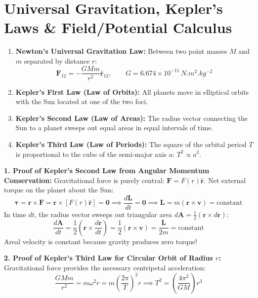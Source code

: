 \documentclass[10pt,a4paper]{article}
\begin{document}
\section{Universal Gravitation, Kepler's Laws \& Field/Potential Calculus}

\begin{conceptbox}
\begin{enumerate}[leftmargin=*]
  \item \textbf{Newton's Universal Gravitation Law:} Between two point masses $M$ and $m$ separated by distance $r$:
  \begin{equation}
    \mathbf{F}_{12} = -\frac{G M m}{r^2}\hat{\mathbf{r}}_{12}, \qquad G = 6.674\times 10^{-11}\,\si{N.m^2.kg^{-2}}
  \end{equation}
  \item \textbf{Kepler's First Law (Law of Orbits):} All planets move in elliptical orbits with the Sun located at one of the two foci.
  \item \textbf{Kepler's Second Law (Law of Areas):} The radius vector connecting the Sun to a planet sweeps out equal areas in equal intervals of time.
  \item \textbf{Kepler's Third Law (Law of Periods):} The square of the orbital period $T$ is proportional to the cube of the semi-major axis $a$: $T^2 \propto a^3$.
\end{enumerate}
\end{conceptbox}

\begin{formulabox}
\textbf{1. Proof of Kepler's Second Law from Angular Momentum Conservation:}
Gravitational force is purely central: $\mathbf{F} = F(r)\hat{\mathbf{r}}$.
Net external torque on the planet about the Sun:
\begin{equation}
  \boldsymbol{\tau} = \mathbf{r} \times \mathbf{F} = \mathbf{r} \times [F(r)\hat{\mathbf{r}}] = \mathbf{0} \implies \frac{d\mathbf{L}}{dt} = \mathbf{0} \implies \mathbf{L} = m(\mathbf{r}\times\mathbf{v}) = \text{constant}
\end{equation}
In time $dt$, the radius vector sweeps out triangular area $d\mathbf{A} = \frac{1}{2}(\mathbf{r}\times d\mathbf{r})$:
\begin{equation}
  \frac{d\mathbf{A}}{dt} = \frac{1}{2}\left(\mathbf{r}\times\frac{d\mathbf{r}}{dt}\right) = \frac{1}{2}(\mathbf{r}\times\mathbf{v}) = \frac{\mathbf{L}}{2m} = \text{constant}
\end{equation}
Areal velocity is constant because gravity produces zero torque!

\textbf{2. Proof of Kepler's Third Law for Circular Orbit of Radius $r$:}
Gravitational force provides the necessary centripetal acceleration:
\begin{equation}
  \frac{G M m}{r^2} = m\omega^2 r = m\left(\frac{2\pi}{T}\right)^2 r \implies T^2 = \left(\frac{4\pi^2}{G M}\right)r^3
\end{equation}
\end{formulabox}
\end{document}
